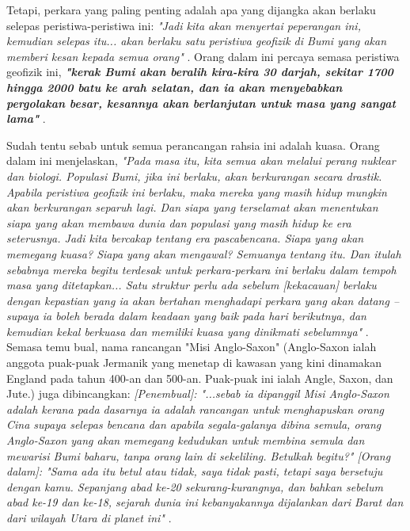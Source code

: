 \documentclass[10pt,twocolumn,letterpaper]{article}
\begin{document}
Tetapi, perkara yang paling penting adalah apa yang dijangka akan berlaku selepas peristiwa-peristiwa ini: \textit{"Jadi kita akan menyertai peperangan ini, kemudian selepas itu... akan berlaku satu peristiwa geofizik di Bumi yang akan memberi kesan kepada semua orang"} \cite{4}. Orang dalam ini percaya semasa peristiwa geofizik ini, \textit{\textbf{"kerak Bumi akan beralih kira-kira 30 darjah, sekitar 1700 hingga 2000 batu ke arah selatan, dan ia akan menyebabkan pergolakan besar, kesannya akan berlanjutan untuk masa yang sangat lama"}} \cite{4}.

Sudah tentu sebab untuk semua perancangan rahsia ini adalah kuasa. Orang dalam ini menjelaskan, \textit{"Pada masa itu, kita semua akan melalui perang nuklear dan biologi. Populasi Bumi, jika ini berlaku, akan berkurangan secara drastik. Apabila peristiwa geofizik ini berlaku, maka mereka yang masih hidup mungkin akan berkurangan separuh lagi. Dan siapa yang terselamat akan menentukan siapa yang akan membawa dunia dan populasi yang masih hidup ke era seterusnya. Jadi kita bercakap tentang era pascabencana. Siapa yang akan memegang kuasa? Siapa yang akan mengawal? Semuanya tentang itu. Dan itulah sebabnya mereka begitu terdesak untuk perkara-perkara ini berlaku dalam tempoh masa yang ditetapkan... Satu struktur perlu ada sebelum [kekacauan] berlaku dengan kepastian yang ia akan bertahan menghadapi perkara yang akan datang -- supaya ia boleh berada dalam keadaan yang baik pada hari berikutnya, dan kemudian kekal berkuasa dan memiliki kuasa yang dinikmati sebelumnya"} \cite{4}. Semasa temu bual, nama rancangan "Misi Anglo-Saxon" (Anglo-Saxon ialah anggota puak-puak Jermanik yang menetap di kawasan yang kini dinamakan England pada tahun 400-an dan 500-an. Puak-puak ini ialah Angle, Saxon, dan Jute.) juga dibincangkan: \textit{[Penembual]: "...sebab ia dipanggil Misi Anglo-Saxon adalah kerana pada dasarnya ia adalah rancangan untuk menghapuskan orang Cina supaya selepas bencana dan apabila segala-galanya dibina semula, orang Anglo-Saxon yang akan memegang kedudukan untuk membina semula dan mewarisi Bumi baharu, tanpa orang lain di sekeliling. Betulkah begitu?" [Orang dalam]: "Sama ada itu betul atau tidak, saya tidak pasti, tetapi saya bersetuju dengan kamu. Sepanjang abad ke-20 sekurang-kurangnya, dan bahkan sebelum abad ke-19 dan ke-18, sejarah dunia ini kebanyakannya dijalankan dari Barat dan dari wilayah Utara di planet ini"} \cite{4}.
\end{document}
